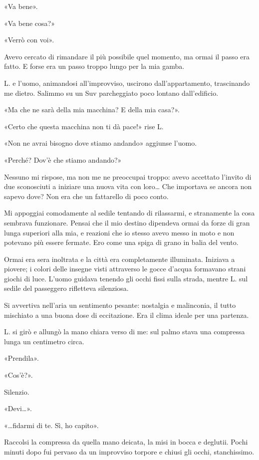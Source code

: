 \documentclass[a4paper,10pt]{memoir}
\begin{document}
«Va bene».

«Va bene cosa?»

«Verrò con voi».

Avevo cercato di rimandare il più possibile quel momento, ma ormai il passo era fatto. E forse era un passo troppo lungo
per la mia gamba.

L. e l'uomo, animandosi all'improvviso, uscirono dall'appartamento, trascinando me dietro. Salimmo su un Suv
parcheggiato poco lontano dall'edificio.

«Ma che ne sarà della mia macchina? E della mia casa?».

«Certo che questa macchina non ti dà pace!» rise L.

«Non ne avrai bisogno dove stiamo andando» aggiunse l'uomo.

«Perché? Dov'è che stiamo andando?»

Nessuno mi rispose, ma non me ne preoccupai troppo: avevo accettato l'invito di due sconosciuti a iniziare una nuova
vita con loro\dots{} Che importava se ancora non sapevo dove? Non era che un fattarello di poco conto.

Mi appoggiai comodamente al sedile tentando di rilassarmi, e stranamente la cosa sembrava funzionare. Pensai che il mio
destino dipendeva ormai da forze di gran lunga superiori alla mia, e reazioni che io stesso avevo messo in moto e non
potevano più essere fermate. Ero come una spiga di grano in balia del vento.

Ormai era sera inoltrata e la città era completamente illuminata. Iniziava a piovere; i colori delle insegne visti
attraverso le gocce d'acqua formavano strani giochi di luce. L'uomo guidava tenendo gli occhi fissi sulla strada, mentre
L. sul sedile del passeggero rifletteva silenziosa.

Si avvertiva nell'aria un sentimento pesante: nostalgia e malinconia, il tutto mischiato a una buona dose di
eccitazione. Era il clima ideale per una partenza.

L. si girò e allungò la mano chiara verso di me: sul palmo stava una compressa lunga un centimetro circa.

«Prendila».

«Cos'è?».

Silenzio.

«Devi\dots{}».

«\dots{}fidarmi di te. Sì, ho capito».

Raccolsi la compressa da quella mano deicata, la misi in bocca e deglutii. Pochi minuti dopo fui pervaso da un
improvviso torpore e chiusi gli occhi, stanchissimo.
\end{document}
